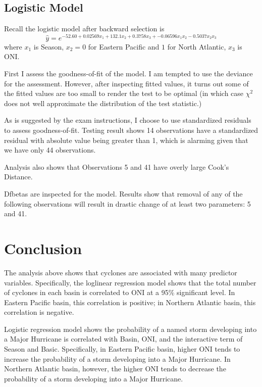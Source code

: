\documentclass[12pt,a4paper]{article}
\begin{document}
\subsection{Logistic Model}

Recall the logistic model after backward selection is 
$$\hat{y} = e^{ -52.60+0.02569x_1 + 132.1x_2 +0.3758x_3+ -0.06596x_1x_2-0.5037x_2x_3}$$
where $x_1$ is Season, $x_2 = 0$ for Eastern Pacific and $1$ for North Atlantic, $x_3$ is ONI.

First I assess the goodness-of-fit of the model. I am tempted to use the deviance for the assessment. However, after inspecting fitted values, it turns out some of the fitted values are too small to render the test to be optimal (in which case $\chi^2$ does not well approximate the distribution of the test statistic.) 

As is suggested by the exam instructions, I choose to use standardized residuals to assess goodness-of-fit. Testing result shows 14 observations have a standardized residual with absolute value being greater than 1, which is alarming given that we have only 44 observations.

Analysis also shows that Observations 5 and 41 have overly large Cook's Distance.

Dfbetas are inspected for the model. Results show that removal of any of the following observations will result in drastic change of at least two parameters: 5 and 41.

\section{Conclusion}

The analysis above shows that cyclones are associated with many predictor variables. Specifically, the loglinear regression model shows that the total number of cyclones in each basin is correlated to ONI at a 95\% significant level. In Eastern Pacific basin, this correlation is positive; in Northern Atlantic basin, this correlation is negative.

Logistic regression model shows the probability of a named storm developing into a Major Hurricane is correlated with Basin, ONI, and the interactive term of Season and Basic. Specifically, in Eastern Pacific basin, higher ONI tends to increase the probability of a storm developing into a Major Hurricane. In Northern Atlantic basin, however, the higher ONI tends to decrease the probability of a storm developing into a Major Hurricane.
\end{document}
